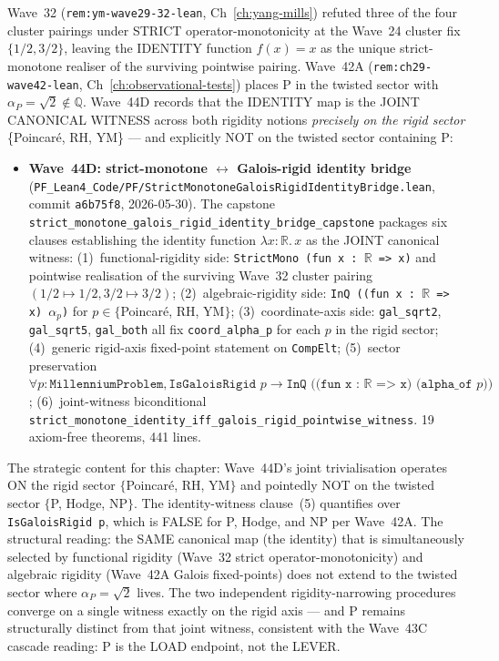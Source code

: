 \begin{remark}[Wave~44D update: identity-witness joint trivialisation isolates P from the rigid-axis canonical witness --- $\alpha_P = \sqrt{2} \notin \mathbb{Q}$ does NOT lie inside the joint witness set, 2026-05-30]\label{rem:p-vs-np-wave44d-lean}
Wave~32 (\texttt{rem:ym-wave29-32-lean}, Ch~\ref{ch:yang-mills}) refuted three of the four cluster pairings under STRICT operator-monotonicity at the Wave~24 cluster fix $\{1/2, 3/2\}$, leaving the IDENTITY function $f(x) = x$ as the unique strict-monotone realiser of the surviving pointwise pairing. Wave~42A (\texttt{rem:ch29-wave42-lean}, Ch~\ref{ch:observational-tests}) places P in the twisted sector with $\alpha_P = \sqrt{2} \notin \mathbb{Q}$. Wave~44D records that the IDENTITY map is the JOINT CANONICAL WITNESS across both rigidity notions \emph{precisely on the rigid sector} \{Poincar\'e, RH, YM\} --- and explicitly NOT on the twisted sector containing P:
\begin{itemize}
  \item \textbf{Wave~44D: strict-monotone $\leftrightarrow$ Galois-rigid identity bridge} (\texttt{PF\_Lean4\_Code/PF/StrictMonotoneGaloisRigidIdentityBridge.lean}, commit \texttt{a6b75f8}, 2026-05-30). The capstone \texttt{strict\_monotone\_galois\_rigid\_identity\_bridge\_capstone} packages six clauses establishing the identity function $\lambda x : \mathbb{R}.\, x$ as the JOINT canonical witness: (1)~functional-rigidity side: \texttt{StrictMono (fun x : $\mathbb{R}$ => x)} and pointwise realisation of the surviving Wave~32 cluster pairing $(1/2 \mapsto 1/2, 3/2 \mapsto 3/2)$; (2)~algebraic-rigidity side: \texttt{InQ ((fun x : $\mathbb{R}$ => x) $\alpha_p$)} for $p \in \{$Poincar\'e, RH, YM$\}$; (3)~coordinate-axis side: \texttt{gal\_sqrt2}, \texttt{gal\_sqrt5}, \texttt{gal\_both} all fix \texttt{coord\_alpha\_p} for each $p$ in the rigid sector; (4)~generic rigid-axis fixed-point statement on \texttt{CompElt}; (5)~sector preservation $\forall p : \texttt{MillenniumProblem}, \texttt{IsGaloisRigid } p \to \texttt{InQ ((fun x : $\mathbb{R}$ => x) (alpha\_of } p))$; (6)~joint-witness biconditional \texttt{strict\_monotone\_identity\_iff\_galois\_rigid\_pointwise\_witness}. 19 axiom-free theorems, 441 lines.
\end{itemize}
The strategic content for this chapter: Wave~44D's joint trivialisation operates ON the rigid sector $\{$Poincar\'e, RH, YM$\}$ and pointedly NOT on the twisted sector $\{$P, Hodge, NP$\}$. The identity-witness clause~(5) quantifies over \texttt{IsGaloisRigid p}, which is FALSE for P, Hodge, and NP per Wave~42A. The structural reading: the SAME canonical map (the identity) that is simultaneously selected by functional rigidity (Wave~32 strict operator-monotonicity) and algebraic rigidity (Wave~42A Galois fixed-points) does not extend to the twisted sector where $\alpha_P = \sqrt{2}$ lives. The two independent rigidity-narrowing procedures converge on a single witness exactly on the rigid axis --- and P remains structurally distinct from that joint witness, consistent with the Wave~43C cascade reading: P is the LOAD endpoint, not the LEVER.


\end{remark}
